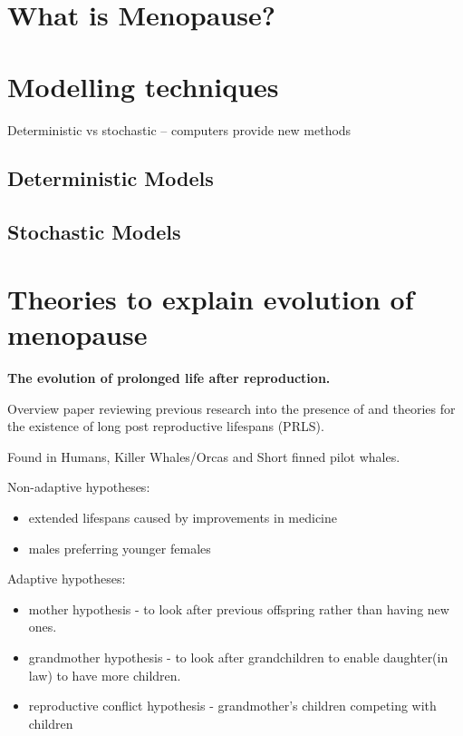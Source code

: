 \section{What is Menopause?}

\section{Modelling techniques}
Deterministic vs stochastic -- computers provide new methods
\subsection{Deterministic Models}
\subsection{Stochastic Models}

\section{Theories to explain evolution of menopause}

\begin{framed}
\noindent \textbf{The evolution of prolonged life after reproduction. \cite{evolutionPRLS2015}}

Overview paper reviewing previous research into the presence of and theories for the existence of long post reproductive lifespans (PRLS).

Found in Humans, Killer Whales/Orcas and Short finned pilot whales.

\noindent Non-adaptive hypotheses:
\begin{itemize}
    \item extended lifespans caused by improvements in medicine
    \item males preferring younger females
\end{itemize}

\noindent Adaptive hypotheses:
\begin{itemize}
    \item mother hypothesis - to look after previous offspring rather than having new ones.
    \item grandmother hypothesis - to look after grandchildren to enable daughter(in law) to have more children.
    \item reproductive conflict hypothesis - grandmother’s children competing with children
\end{itemize}
\end{framed}

